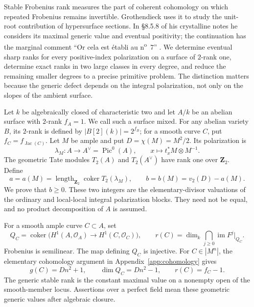 \documentclass[11pt]{article}
\theoremstyle{definition}\newtheorem{definition}[theorem]{Definition}
\theoremstyle{remark}\newtheorem{remark}[theorem]{Remark}
\newcommand{\OO}{\mathcal O}
\newcommand{\Pic}{\operatorname{Pic}}
\begin{document}
Stable Frobenius rank measures the part of coherent cohomology on which repeated Frobenius remains invertible. Grothendieck uses it to study the unit-root contribution of hypersurface sections. In \S8.5.8 of his crystalline notes he considers its maximal generic value and eventual positivity; the continuation has the marginal comment ``Or cela est \'etabli au n\textsuperscript{o}~7'' \citep[cote~4, archive sheets~7--8, PDF images~8--9]{Grothendieck}. We determine eventual sharp ranks for every positive-index polarization on a surface of $2$-rank one, determine exact ranks in two large classes in every degree, and reduce the remaining smaller degrees to a precise primitive problem. The distinction matters because the generic defect depends on the integral polarization, not only on the slopes of the ambient surface.

Let $k$ be algebraically closed of characteristic two and let $A/k$ be an abelian surface with $2$-rank $f_A=1$. We call such a surface mixed. For any abelian variety $B$, its $2$-rank is defined by $|B[2](k)|=2^{f_B}$; for a smooth curve $C$, put $f_C=f_{\operatorname{Jac}(C)}$. Let $M$ be ample and put $D=\chi(M)=M^2/2$. Its polarization is
\[
 \lambda_M:A\longrightarrow A^\vee=\Pic^0(A),\qquad
 x\longmapsto t_x^*M\otimes M^{-1}.
\]
The geometric Tate modules $T_2(A)$ and $T_2(A^\vee)$ have rank one over $\mathbf Z_2$. Define
\[
 a=a(M)=\operatorname{length}_{\mathbf Z_2}\operatorname{coker}T_2(\lambda_M),
 \qquad b=b(M)=v_2(D)-a(M).
\]
We prove that $b\ge0$. These two integers are the elementary-divisor valuations of the ordinary and local-local integral polarization blocks. They need not be equal, and no product decomposition of $A$ is assumed.

For a smooth ample curve $C\subset A$, set
\[
 Q_C=\operatorname{coker}\bigl(H^1(A,\OO_A)\longrightarrow H^1(C,\OO_C)\bigr),
 \qquad r(C)=\dim_k\bigcap_{j\ge0}\operatorname{im}F^j|_{Q_C}.
\]
Frobenius is semilinear. The map defining $Q_C$ is injective. For $C\in|M^n|$, the elementary cohomology argument in Appendix~\ref{app:cohomology} gives
\begin{equation}\label{eq:dimensions}
 g(C)=Dn^2+1,\qquad \dim Q_C=Dn^2-1,\qquad r(C)=f_C-1.
\end{equation}
The generic stable rank is the constant maximal value on a nonempty open of the smooth-member locus. Assertions over a perfect field mean these geometric generic values after algebraic closure.
\end{document}
